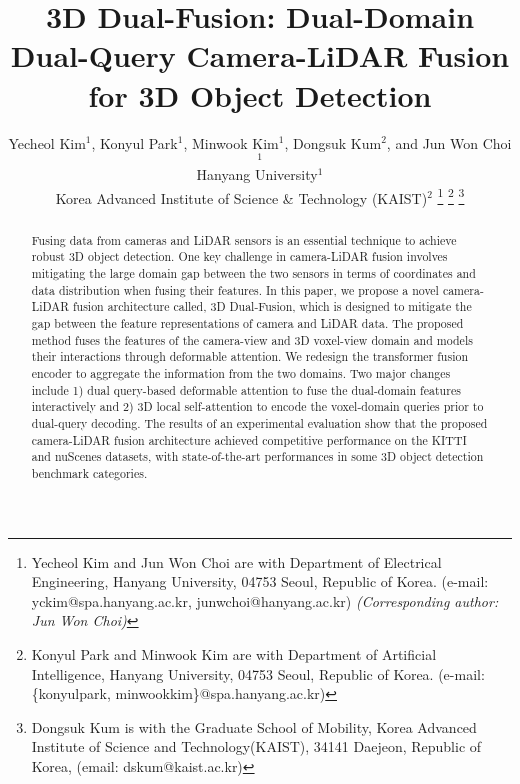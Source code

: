 \documentclass[lettersize,journal]{IEEEtran}
\begin{document}
\title{3D Dual-Fusion: Dual-Domain Dual-Query Camera-LiDAR Fusion for 3D Object Detection}

\author{Yecheol Kim$^1$, Konyul Park$^1$, Minwook Kim$^1$, Dongsuk Kum$^2$, and Jun Won Choi$^1$ \\
Hanyang University$^1$ \\ Korea Advanced Institute of Science \& Technology (KAIST)$^2$
\thanks{Yecheol Kim and Jun Won Choi are with Department of Electrical Engineering, Hanyang University, 04753 Seoul, Republic of Korea. (e-mail: yckim@spa.hanyang.ac.kr, junwchoi@hanyang.ac.kr) \textit{(Corresponding author: Jun Won Choi)}}
\thanks{Konyul Park and Minwook Kim are with Department of Artificial Intelligence, Hanyang University, 04753 Seoul, Republic of Korea. (e-mail: \{konyulpark, minwookkim\}@spa.hanyang.ac.kr)}
\thanks{Dongsuk Kum is with the Graduate School of Mobility, Korea Advanced Institute of Science and Technology(KAIST), 34141 Daejeon, Republic of Korea, (email: dskum@kaist.ac.kr)}}





\maketitle

\begin{abstract}
Fusing data from cameras and LiDAR sensors is an essential technique to achieve robust 3D object detection. One key challenge in camera-LiDAR fusion involves mitigating the large domain gap between the two sensors in terms of coordinates and data distribution when fusing their features. In this paper, we propose a novel camera-LiDAR fusion architecture called, 3D Dual-Fusion, which is designed to mitigate the gap between the feature representations of camera and LiDAR data. The proposed method fuses the features of the camera-view and 3D voxel-view domain and models their interactions through deformable attention. We redesign the transformer fusion encoder to aggregate the information from the two domains. Two major changes include 1) dual query-based deformable attention to fuse the dual-domain features interactively and 2) 3D local self-attention to encode the voxel-domain queries prior to dual-query decoding. The results of an experimental evaluation show that the proposed camera-LiDAR fusion architecture achieved competitive performance on the KITTI and nuScenes datasets, with state-of-the-art performances in some 3D object detection benchmark categories.
\end{abstract}
\end{document}
